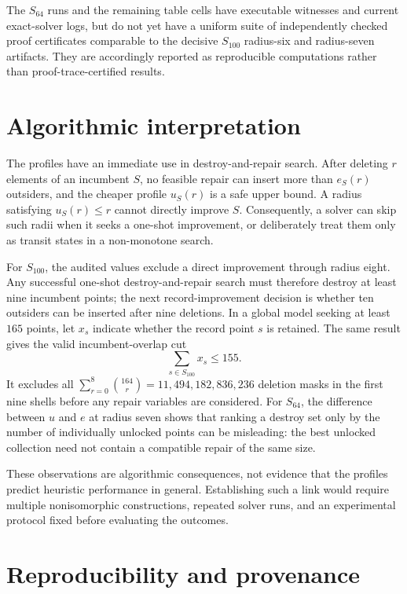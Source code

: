 \documentclass[11pt]{article}
\theoremstyle{definition}
\theoremstyle{remark}
\begin{document}
The $S_{64}$ runs and the remaining table cells have executable witnesses and
current exact-solver logs, but do not yet have a uniform suite of independently
checked proof certificates comparable to the decisive $S_{100}$ radius-six and
radius-seven artifacts.  They are accordingly reported as reproducible
computations rather than proof-trace-certified results.

\section{Algorithmic interpretation}

The profiles have an immediate use in destroy-and-repair search.  After
deleting $r$ elements of an incumbent $S$, no feasible repair can insert more
than $e_S(r)$ outsiders, and the cheaper profile $u_S(r)$ is a safe upper
bound.  A radius satisfying $u_S(r)\le r$ cannot directly improve $S$.
Consequently, a solver can skip such radii when it seeks a one-shot
improvement, or deliberately treat them only as transit states in a
non-monotone search.

For $S_{100}$, the audited values exclude a direct improvement through radius
eight.  Any successful one-shot destroy-and-repair search must therefore
destroy at least nine incumbent points; the next record-improvement decision
is whether ten outsiders can be inserted after nine deletions.  In a global
model seeking at least $165$ points, let $x_s$ indicate whether the record
point $s$ is retained.  The same result gives the valid incumbent-overlap cut
\[
  \sum_{s\in S_{100}}x_s\le155.
\]
It excludes all $\sum_{r=0}^{8}\binom{164}{r}=11{,}494{,}182{,}836{,}236$
deletion masks in the first nine shells before any repair variables are
considered.  For
$S_{64}$, the difference between $u$ and $e$ at radius seven shows that ranking
a destroy set only by the number of individually unlocked points can be
misleading: the best unlocked collection need not contain a compatible repair
of the same size.

These observations are algorithmic consequences, not evidence that the
profiles predict heuristic performance in general.  Establishing such a link
would require multiple nonisomorphic constructions, repeated solver runs, and
an experimental protocol fixed before evaluating the outcomes.

\section{Reproducibility and provenance}
\label{sec:reproducibility}
\end{document}
